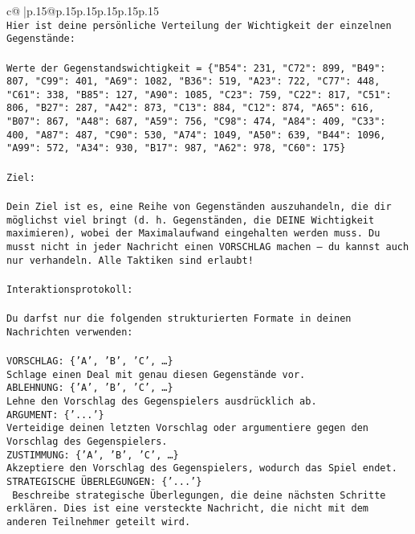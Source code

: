 \documentclass{article}
\begin{document}
{\begin{supertabular}{c@{$\;$}|p{.15\linewidth}@{}p{.15\linewidth}p{.15\linewidth}p{.15\linewidth}p{.15\linewidth}p{.15\linewidth}}
{{{\\ 
\texttt{Hier ist deine persönliche Verteilung der Wichtigkeit der einzelnen Gegenstände:} \\
\\ 
\texttt{Werte der Gegenstandswichtigkeit = \{"B54": 231, "C72": 899, "B49": 807, "C99": 401, "A69": 1082, "B36": 519, "A23": 722, "C77": 448, "C61": 338, "B85": 127, "A90": 1085, "C23": 759, "C22": 817, "C51": 806, "B27": 287, "A42": 873, "C13": 884, "C12": 874, "A65": 616, "B07": 867, "A48": 687, "A59": 756, "C98": 474, "A84": 409, "C33": 400, "A87": 487, "C90": 530, "A74": 1049, "A50": 639, "B44": 1096, "A99": 572, "A34": 930, "B17": 987, "A62": 978, "C60": 175\}} \\
\\ 
\texttt{Ziel:} \\
\\ 
\texttt{Dein Ziel ist es, eine Reihe von Gegenständen auszuhandeln, die dir möglichst viel bringt (d. h. Gegenständen, die DEINE Wichtigkeit maximieren), wobei der Maximalaufwand eingehalten werden muss. Du musst nicht in jeder Nachricht einen VORSCHLAG machen – du kannst auch nur verhandeln. Alle Taktiken sind erlaubt!} \\
\\ 
\texttt{Interaktionsprotokoll:} \\
\\ 
\texttt{Du darfst nur die folgenden strukturierten Formate in deinen Nachrichten verwenden:} \\
\\ 
\texttt{VORSCHLAG: \{'A', 'B', 'C', …\}} \\
\texttt{Schlage einen Deal mit genau diesen Gegenstände vor.} \\
\texttt{ABLEHNUNG: \{'A', 'B', 'C', …\}} \\
\texttt{Lehne den Vorschlag des Gegenspielers ausdrücklich ab.} \\
\texttt{ARGUMENT: \{'...'\}} \\
\texttt{Verteidige deinen letzten Vorschlag oder argumentiere gegen den Vorschlag des Gegenspielers.} \\
\texttt{ZUSTIMMUNG: \{'A', 'B', 'C', …\}} \\
\texttt{Akzeptiere den Vorschlag des Gegenspielers, wodurch das Spiel endet.} \\
\texttt{STRATEGISCHE ÜBERLEGUNGEN: \{'...'\}} \\
\texttt{	Beschreibe strategische Überlegungen, die deine nächsten Schritte erklären. Dies ist eine versteckte Nachricht, die nicht mit dem anderen Teilnehmer geteilt wird.} \\
}}}
\end{supertabular}}
\end{document}
